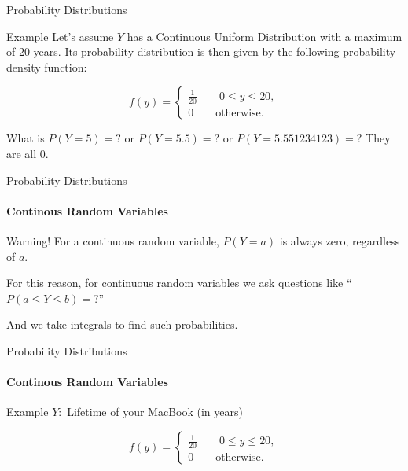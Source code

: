 \documentclass{beamer}\usepackage[]{graphicx}\usepackage[]{color}
\begin{document}
\begin{darkframes}
\begin{frame}[label=lists]{Probability Distributions}
\begin{exampleblock}{Example}
		Let's assume $Y$ has a \alert{Continuous Uniform Distribution} with a maximum of 20 years. Its probability distribution is then given by the following probability density function: \newline
		
		$$ f(y) = 
			\begin{cases}
				\frac{1}{20} \qquad 0 \leq y \leq 20, \\
				0 \qquad   \text{otherwise.}
			\end{cases}
		$$
		
		What is $P(Y=5)=?$ or $P(Y=5.5)=?$ or $P(Y=5.551234123)=?$ \newline
		They are all 0.
		
		
		\end{exampleblock}
			
	\end{frame}





	\begin{frame}[label=lists]{Probability Distributions}
		\framesubtitle{Continous Random Variables} 
	
		\begin{alertblock}{Warning!}
        For a continuous random variable, $P(Y=a)$ is always zero, regardless of $a$. \newline
      \end{alertblock} 
      
      For this reason, for continuous random variables we ask questions like ``$P(a \leq Y \leq b)=?$'' \newline
      
      And we take integrals to find such probabilities.
			
	\end{frame}


	\begin{frame}[label=lists]{Probability Distributions}
		\framesubtitle{Continous Random Variables} 

		\begin{exampleblock}{Example}
		$Y:$ Lifetime of your MacBook (in years) \newline
		
		$$ f(y) = 
			\begin{cases}
				\frac{1}{20} \qquad 0 \leq y \leq 20, \\
				0 \qquad   \text{otherwise.}
			\end{cases}
		$$
		

\end{exampleblock}
\end{frame}
\end{darkframes}
\end{document}
